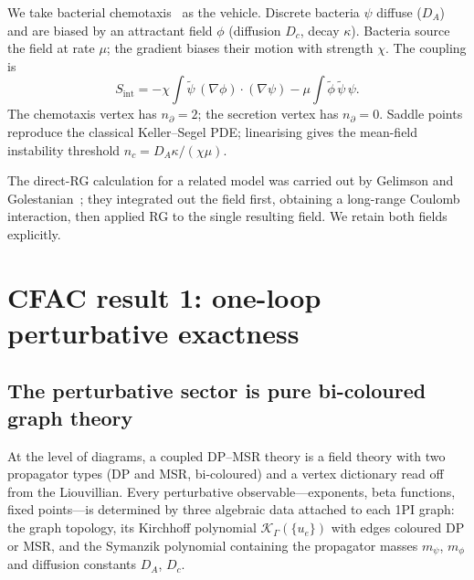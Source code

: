 \documentclass[11pt,a4paper]{article}
\newcommand{\psit}{\tilde\psi}
\newcommand{\phit}{\tilde\phi}
\theoremstyle{plain}
\begin{document}
We take bacterial chemotaxis~\cite{KellerSegel1970} as the vehicle.
Discrete bacteria $\psi$ diffuse ($D_A$) and are biased by an
attractant field $\phi$ (diffusion $D_c$, decay $\kappa$).
Bacteria source the field at rate $\mu$; the gradient biases
their motion with strength $\chi$.  The coupling is
\begin{equation}\label{eq:KS-vertices}
  S_{\mathrm{int}}
  = -\chi\!\int\!\psit\,(\nabla\phi)\!\cdot\!(\nabla\psi)
  - \mu\!\int\!\phit\,\psit\,\psi.
\end{equation}
The chemotaxis vertex has $n_\partial = 2$; the secretion vertex
has $n_\partial = 0$.  Saddle points reproduce the classical
Keller--Segel PDE; linearising gives the mean-field instability
threshold $n_c = D_A\kappa/(\chi\mu)$.

The direct-RG calculation for a related model was carried out by
Gelimson and Golestanian~\cite{GelimsonGolestanian2015}; they
integrated out the field first, obtaining a long-range Coulomb
interaction, then applied RG to the single resulting field.  We
retain both fields explicitly.

\section{CFAC result 1: one-loop perturbative exactness}
\label{sec:oneloop-exact}

\subsection{The perturbative sector is pure bi-coloured graph theory}

At the level of diagrams, a coupled DP--MSR theory is a field
theory with two propagator types (DP and MSR, bi-coloured) and a
vertex dictionary read off from the Liouvillian.  Every
perturbative observable---exponents, beta functions, fixed
points---is determined by three algebraic data attached to each
1PI graph: the graph topology, its Kirchhoff polynomial
$\mathcal{K}_\Gamma(\{u_e\})$ with edges coloured DP or MSR, and
the Symanzik polynomial containing the propagator masses
$m_\psi$, $m_\phi$ and diffusion constants $D_A$, $D_c$.
\end{document}
